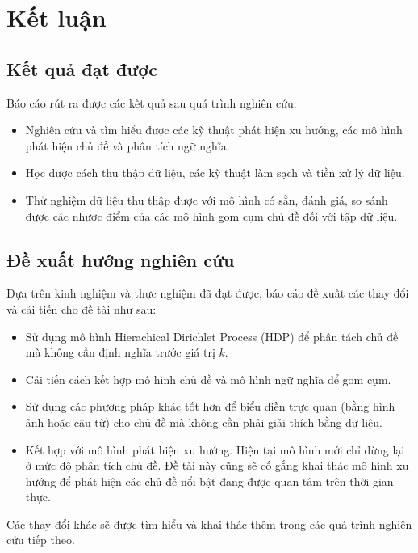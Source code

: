 \chapter{Kết luận}
\section{Kết quả đạt được}
Báo cáo rút ra được các kết quả sau quá trình nghiên cứu:
\begin{itemize}
    \item Nghiên cứu và tìm hiểu được các kỹ thuật phát hiện xu hướng, các mô hình phát hiện chủ đề và phân tích ngữ nghĩa.
    \item Học được cách thu thập dữ liệu, các kỹ thuật làm sạch và tiền xử lý dữ liệu.
    \item Thử nghiệm dữ liệu thu thập được với mô hình có sẵn, đánh giá, so sánh được các nhược điểm của các mô hình gom cụm chủ đề đối với tập dữ liệu.
\end{itemize}

\section{Đề xuất hướng nghiên cứu}
Dựa trên kinh nghiệm và thực nghiệm đã đạt được, báo cáo đề xuất các thay đổi và cải tiến cho đề tài như sau:

\begin{itemize}
    \item Sử dụng mô hình Hierachical Dirichlet Process (HDP) để phân tách chủ đề mà không cần định nghĩa trước giá trị $k$.
    \item Cải tiến cách kết hợp mô hình chủ đề và mô hình ngữ nghĩa để gom cụm.
    \item Sử dụng các phương pháp khác tốt hơn để biểu diễn trực quan (bằng hình ảnh hoặc câu từ) cho chủ đề mà không cần phải giải thích bằng dữ liệu.
    \item Kết hợp với mô hình phát hiện xu hướng. Hiện tại mô hình mới chỉ dừng lại ở mức độ phân tích chủ đề. Đề tài này cũng sẽ cố gắng khai thác mô hình xu hướng để phát hiện các chủ đề nổi bật đang được quan tâm trên thời gian thực.
\end{itemize}

Các thay đổi khác sẽ được tìm hiểu và khai thác thêm trong các quá trình nghiên cứu tiếp theo.
